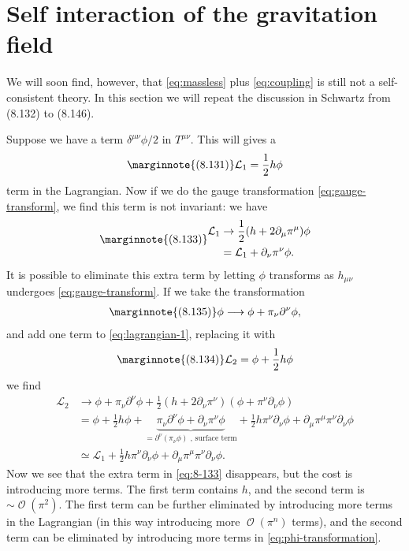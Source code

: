 \documentclass[hyperref, a4paper]{article}
\DeclareMathOperator{\bigO}{\mathcal{O}}
\begin{document}
\section{Self interaction of the gravitation field}

We will soon find, however, that \eqref{eq:massless} plus \eqref{eq:coupling} is still not a self-consistent 
theory. In this section we will repeat the discussion in Schwartz from (8.132) to (8.146). 

Suppose we have a term $\delta^{\mu \nu} \phi / 2$ in $T^{\mu \nu}$. This will gives a 
\begin{equation} \marginnote{(8.131)}
    \mathcal{L}_1 = \frac{1}{2} h \phi 
    \label{eq:lagrangian-1}
\end{equation}
term in the Lagrangian. Now if we do the gauge transformation \eqref{eq:gauge-transform}, we find this term is 
not invariant: we have 
\begin{equation}
    \marginnote{(8.133)}
    \begin{aligned}
        \mathcal{L}_1 &\to \frac{1}{2} (h + 2 \partial_\mu \pi^\mu) \phi \\
        &= \mathcal{L}_1 + \partial_\nu \pi^\nu \phi.
    \end{aligned}
    \label{eq:8-133}
\end{equation}
It is possible to eliminate this extra term by letting $\phi$ transforms as $h_{\mu \nu}$ undergoes 
\eqref{eq:gauge-transform}. If we take the transformation 
\begin{eqnarray} \marginnote{(8.135)}
    \phi \longrightarrow \phi + \pi_\nu \partial^\nu \phi,
    \label{eq:phi-transformation}
\end{eqnarray}
and add one term to \eqref{eq:lagrangian-1}, replacing it with 
\begin{equation} \marginnote{(8.134)}
    \mathcal{L}_2 = \phi + \frac{1}{2} h \phi
\end{equation}
we find 
\[
    \begin{aligned}
        \mathcal{L}_2 & \to \phi + \pi_\nu \partial^\nu \phi + \frac{1}{2} (h + 2 \partial_\nu \pi^\nu) (\phi +  \pi^\nu \partial_\nu \phi) \\
        &= \phi + \frac{1}{2} h \phi + \underbrace{\pi_\nu \partial^\nu \phi + \partial_\nu \pi^\nu \phi}_{= \partial^\nu (\pi_\nu \phi) \text{ , surface term}} + \frac{1}{2} h \pi^\nu \partial_\nu \phi + \partial_\mu \pi^\mu \pi^\nu \partial_\nu \phi \\
        &\simeq \mathcal{L}_1 + \frac{1}{2} h \pi^\nu \partial_\nu \phi + \partial_\mu \pi^\mu \pi^\nu \partial_\nu \phi.
    \end{aligned}
\]
Now we see that the extra term in \eqref{eq:8-133} disappears, but the cost is introducing more terms. 
The first term contains $h$, and the second term is $\sim \bigO(\pi^2)$. The first term can be further 
eliminated by introducing more terms in the Lagrangian (in this way introducing more $\bigO(\pi^n)$ terms),
and the second term can be eliminated by introducing more terms in \eqref{eq:phi-transformation}.
\end{document}
